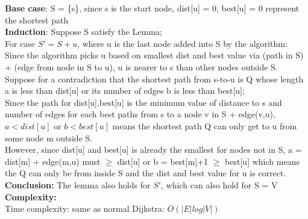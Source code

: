 \documentclass{article}
\begin{document}
\textbf{Base case}: S = \{s\}, since s is the start node, dist[u] = 0, best[u] = 0 represent the shortest path\\
\textbf{Induction}: Suppose S satisfy the Lemma;\\
For case $S' = S + u$, where u is the last node added into S by the algorithm:\\
Since the algorithm picks u based on smallest dist and best value via (path in S) + (edge from node in S to u), u is nearer to s than other nodes outside S.
Suppose for a contradiction that the shortest path from s-to-u is Q whose length a is less than dist[u] or its number of edges b is less than best[u];\\
Since the path for dist[u],best[u] is the minimum value of distance to s and number of edges for each best paths from s to a node v in S + edge(v,u), $a<dist[u]$ or $b<best[u]$ means the shortest path Q can only get to u from some node m outside S.\\
However, since dist[u] and best[u] is already the smallest for nodes not in S, a = dist[m] + edge(m,u) must $\ge$ dist[u] or b = best[m]+1 $\ge$ best[u] which means the Q can only be from inside S and the dist and best value for u is correct.\\
\textbf{Conclusion:}
The lemma also holds for $S'$, which can also hold for S = V\\
\textbf{\large Complexity:\\}
Time complexity: same as normal Dijkstra: $O(|E| log |V|)$

\clearpage
\end{document}
